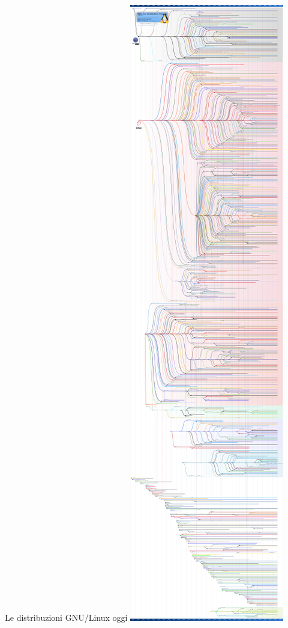 
\begin{frame}{Le distribuzioni GNU/Linux oggi}
    \centering
    \includegraphics[scale=0.2]{images/Linux_Distribution_Timeline_Dec._2020.svg.png}
\end{frame}

